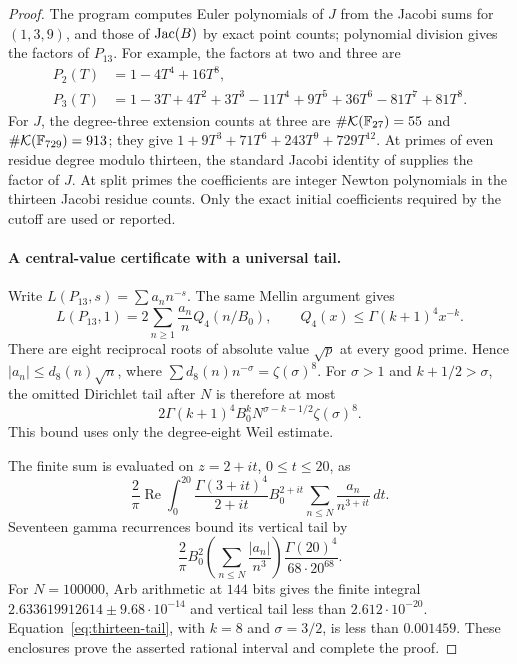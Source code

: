 \begin{proof}
The program computes Euler polynomials of $J$ from the Jacobi sums
for $(1,3,9)$, and those of $\operatorname{Jac}(B)$ by exact point counts;
polynomial division gives the factors of $P_{13}$.
For example, the factors at two and three are
\[
 \begin{split}
 P_2(T)&=1-4T^4+16T^8,\\
 P_3(T)&=1-3T+4T^2+3T^3-11T^4+9T^5
                       +36T^6-81T^7+81T^8.
 \end{split}
\]
For $J$, the degree-three extension counts at three are
$\#\mathcal K(\mathbb F_{27})=55$ and
$\#\mathcal K(\mathbb F_{729})=913$; they give
$1+9T^3+71T^6+243T^9+729T^{12}$.
At primes of even residue degree modulo thirteen, the standard
Jacobi identity of \citet[Lemma~1.1]{GrossRohrlich1978} supplies
the factor of $J$. At split primes the coefficients are integer
Newton polynomials in the thirteen Jacobi residue counts.
Only the exact initial coefficients required by the cutoff are
used or reported.

\paragraph{A central-value certificate with a universal tail.}
Write $L(P_{13},s)=\sum a_nn^{-s}$. The same Mellin argument gives
\[
 L(P_{13},1)=2\sum_{n\ge1}\frac{a_n}{n}Q_4(n/B_0),\qquad
 Q_4(x)\le\Gamma(k+1)^4x^{-k}.
\]
There are eight reciprocal roots of absolute value $\sqrt p$ at
every good prime. Hence $|a_n|\le d_8(n)\sqrt n$, where
$\sum d_8(n)n^{-\sigma}=\zeta(\sigma)^8$.
For $\sigma>1$ and $k+1/2>\sigma$, the omitted Dirichlet tail
after $N$ is therefore at most
\begin{equation}\tag{5.9}\label{eq:thirteen-tail}
 2\Gamma(k+1)^4B_0^kN^{\sigma-k-1/2}\zeta(\sigma)^8.
\end{equation}
This bound uses only the degree-eight Weil estimate.

The finite sum is evaluated on $z=2+it$, $0\le t\le20$, as
\[
 \frac2\pi\operatorname{Re}\int_0^{20}
 \frac{\Gamma(3+it)^4}{2+it}B_0^{2+it}
 \sum_{n\le N}\frac{a_n}{n^{3+it}}\,dt.
\]
Seventeen gamma recurrences bound its vertical tail by
\[
 \frac2\pi B_0^2\left(\sum_{n\le N}\frac{|a_n|}{n^3}\right)
 \frac{\Gamma(20)^4}{68\cdot20^{68}}.
\]
For $N=100000$, Arb arithmetic at $144$ bits gives the finite
integral $2.633619912614\pm9.68\cdot10^{-14}$ and vertical tail
less than $2.612\cdot10^{-20}$.
Equation~\eqref{eq:thirteen-tail}, with $k=8$ and $\sigma=3/2$,
is less than $0.001459$. These enclosures prove the asserted
rational interval and complete the proof.
\end{proof}

